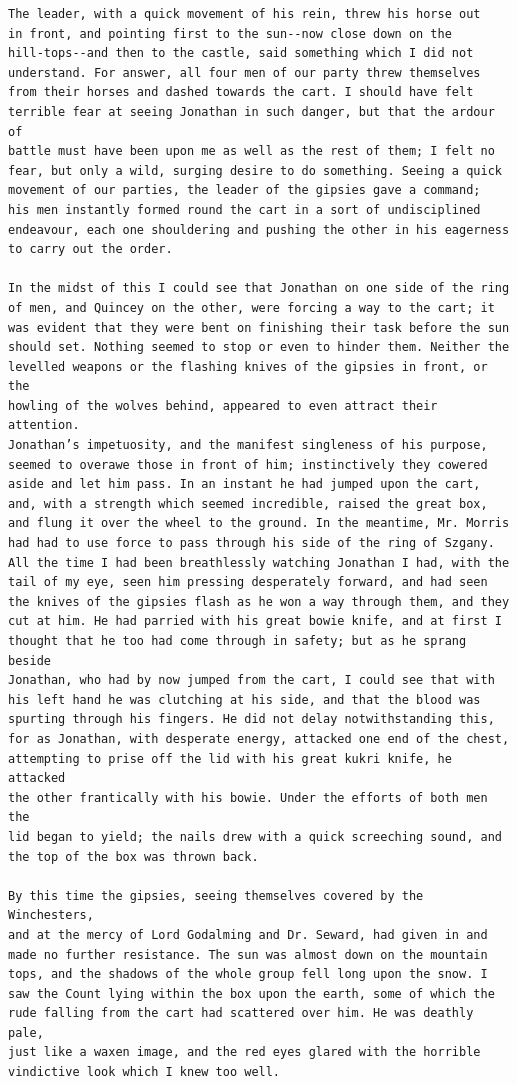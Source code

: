 \documentclass{article}
\begin{document}
\begin{verbatim}
The leader, with a quick movement of his rein, threw his horse out
in front, and pointing first to the sun--now close down on the
hill-tops--and then to the castle, said something which I did not
understand. For answer, all four men of our party threw themselves
from their horses and dashed towards the cart. I should have felt
terrible fear at seeing Jonathan in such danger, but that the ardour of
battle must have been upon me as well as the rest of them; I felt no
fear, but only a wild, surging desire to do something. Seeing a quick
movement of our parties, the leader of the gipsies gave a command;
his men instantly formed round the cart in a sort of undisciplined
endeavour, each one shouldering and pushing the other in his eagerness
to carry out the order.

In the midst of this I could see that Jonathan on one side of the ring
of men, and Quincey on the other, were forcing a way to the cart; it
was evident that they were bent on finishing their task before the sun
should set. Nothing seemed to stop or even to hinder them. Neither the
levelled weapons or the flashing knives of the gipsies in front, or the
howling of the wolves behind, appeared to even attract their attention.
Jonathan’s impetuosity, and the manifest singleness of his purpose,
seemed to overawe those in front of him; instinctively they cowered
aside and let him pass. In an instant he had jumped upon the cart,
and, with a strength which seemed incredible, raised the great box,
and flung it over the wheel to the ground. In the meantime, Mr. Morris
had had to use force to pass through his side of the ring of Szgany.
All the time I had been breathlessly watching Jonathan I had, with the
tail of my eye, seen him pressing desperately forward, and had seen
the knives of the gipsies flash as he won a way through them, and they
cut at him. He had parried with his great bowie knife, and at first I
thought that he too had come through in safety; but as he sprang beside
Jonathan, who had by now jumped from the cart, I could see that with
his left hand he was clutching at his side, and that the blood was
spurting through his fingers. He did not delay notwithstanding this,
for as Jonathan, with desperate energy, attacked one end of the chest,
attempting to prise off the lid with his great kukri knife, he attacked
the other frantically with his bowie. Under the efforts of both men the
lid began to yield; the nails drew with a quick screeching sound, and
the top of the box was thrown back.

By this time the gipsies, seeing themselves covered by the Winchesters,
and at the mercy of Lord Godalming and Dr. Seward, had given in and
made no further resistance. The sun was almost down on the mountain
tops, and the shadows of the whole group fell long upon the snow. I
saw the Count lying within the box upon the earth, some of which the
rude falling from the cart had scattered over him. He was deathly pale,
just like a waxen image, and the red eyes glared with the horrible
vindictive look which I knew too well.


\end{verbatim}
\end{document}

